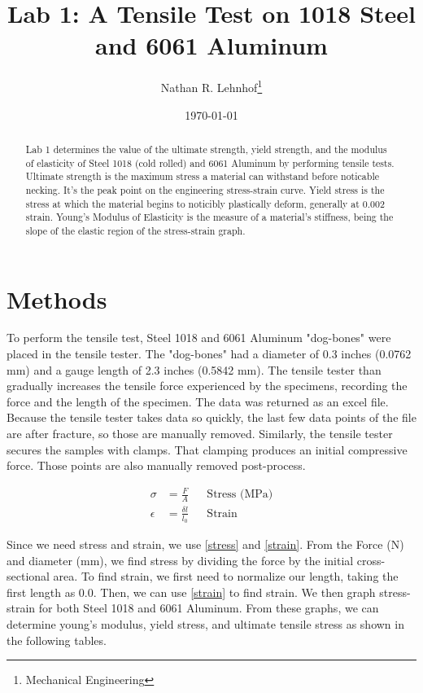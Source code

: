 \documentclass[conf]{new-aiaa} %
\begin{document}
\sloppy %

\title{Lab 1: A Tensile Test on 1018 Steel and 6061 Aluminum}
\author{Nathan R. Lehnhof\footnote{Mechanical Engineering}}
\date{\today}
\maketitle

\begin{abstract}
Lab 1 determines the value of the ultimate strength, yield strength, and the modulus of elasticity of Steel 1018 (cold rolled) and 6061 Aluminum by performing tensile tests.
Ultimate strength is the maximum stress a material can withstand before noticable necking.
It's the peak point on the engineering stress-strain curve.
Yield stress is the stress at which the material begins to noticibly plastically deform, generally at 0.002 strain.
Young's Modulus of Elasticity is the measure of a material's stiffness, being the slope of the elastic region of the stress-strain graph.
\end{abstract}

\section{Methods}
To perform the tensile test, Steel 1018 and 6061 Aluminum "dog-bones" were placed in the tensile tester.
The "dog-bones" had a diameter of 0.3 inches (0.0762 mm) and a gauge length of 2.3 inches (0.5842 mm).
The tensile tester than gradually increases the tensile force experienced by the specimens, recording the force and the length of the specimen.
The data was returned as an excel file.
Because the tensile tester takes data so quickly, the last few data points of the file are after fracture, so those are manually removed.
Similarly, the tensile tester secures the samples with clamps.
That clamping produces an initial compressive force.
Those points are also manually removed post-process.

\begin{align}
    \sigma &= \frac{F}{A} \label{stress}
    && \text{Stress (MPa)} \\[6pt]
    \epsilon &= \frac{\delta l}{l_0} \label{strain} 
    && \text{Strain}
\end{align}

Since we need stress and strain, we use \autoref{stress} and \autoref{strain}.
From the Force (N) and diameter (mm), we find stress by dividing the force by the initial cross-sectional area.
To find strain, we first need to normalize our length, taking the first length as 0.0.
Then, we can use \autoref{strain} to find strain.
We then graph stress-strain for both Steel 1018 and 6061 Aluminum.
From these graphs, we can determine young's modulus, yield stress, and ultimate tensile stress as shown in the following tables.
\end{document}
